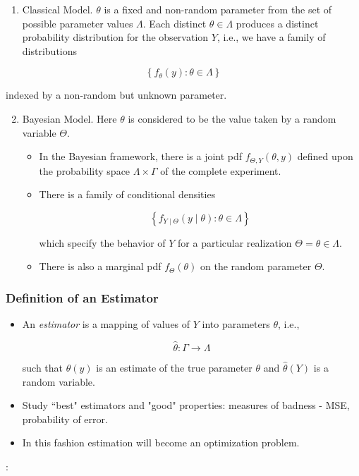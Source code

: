 \documentclass[12pt,thmsa]{article}
\begin{document}
\begin{enumerate}
	\item Classical Model. $\theta$ is a fixed and non-random parameter from the set of possible parameter values $\Lambda$. Each distinct $\theta \in \Lambda$ produces a distinct probability distribution for the observation $Y$, i.e., we have a family of distributions
\end{enumerate}

$$
\left\{f_{\theta}(y): \theta \in \Lambda\right\}
$$

indexed by a non-random but unknown parameter.

\begin{enumerate}
	\setcounter{enumi}{1}
	\item Bayesian Model. Here $\theta$ is considered to be the value taken by a random variable $\Theta$.
	
	\begin{itemize}
		\item In the Bayesian framework, there is a joint pdf $f_{\Theta, Y}(\theta, y)$ defined upon the probability space $\Lambda \times \Gamma$ of the complete experiment.
		\item There is a family of conditional densities
		
		$$
		\left\{f_{Y \mid \Theta}(y \mid \theta): \theta \in \Lambda\right\}
		$$
		
		which specify the behavior of $Y$ for a particular realization $\Theta=\theta \in \Lambda$.
		
		\item There is also a marginal pdf $f_{\Theta}(\theta)$ on the random parameter $\Theta$.
		
	\end{itemize}

\end{enumerate}


\subsubsection{Definition of an Estimator}
\begin{itemize}
	\item An \textit{estimator} is a mapping of values of $Y$ into parameters $\theta$, i.e.,

	$$
	\hat{\theta}: \Gamma \rightarrow \Lambda
	$$
	
	such that $\hat{\theta}(y)$ is an estimate of the true parameter $\theta$ and $\hat{\theta}(Y)$ is a random variable.

	\item Study ``best" estimators and "good" properties: measures of badness - MSE, probability of error.
	
	\item In this fashion estimation will become an optimization problem.
\end{itemize}


\bigskip

\noindent
[Ref]: 
\end{document}

